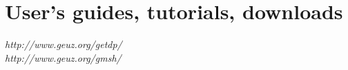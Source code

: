 \documentclass[a4]{seminar}
\begin{document}









\chapter{User's guides, tutorials, downloads}

\begin{slide}
\begin{center}
\emph{http://www.geuz.org/getdp/} \\ \bigskip
\emph{http://www.geuz.org/gmsh/}
\end{center}
\end{slide}
\end{document}
